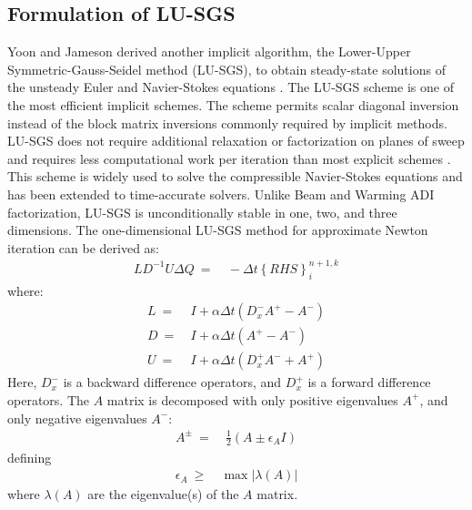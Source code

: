 \documentclass[conf]{new-aiaa}
\begin{document}
\subsection{Formulation of LU-SGS}
Yoon and Jameson derived another implicit algorithm, the Lower-Upper Symmetric-Gauss-Seidel method (LU-SGS), to obtain steady-state solutions of the unsteady Euler and Navier-Stokes equations \cite{LUSGS}.
The LU-SGS scheme is one of the most efficient implicit schemes. 
The scheme permits scalar diagonal inversion instead of the block matrix inversions commonly required by implicit methods.  
LU-SGS does not require additional relaxation or factorization on planes of sweep and requires less computational work per iteration than most explicit schemes \cite{YoonLUSGS}.
This scheme is widely used to solve the compressible Navier-Stokes equations and has been extended to time-accurate solvers. 
Unlike Beam and Warming \cite{Beam} ADI factorization, LU-SGS is unconditionally stable in one, two, and three dimensions. The one-dimensional LU-SGS method for approximate Newton iteration can be derived as:
\begin{equation}
	\begin{split}
	\label{eq:LSGSUFinal}
		LD^{-1}U\Delta{Q}~=&~-\Delta{t}\left\{RHS\right\}^{n+1, k}_i
	\end{split}
\end{equation}
where:
\begin{equation}
	\begin{split}
            L~=&~I + \alpha\Delta{t}\left(D_x^-A^+-A^-\right)\\
		D~=&~I + \alpha\Delta{t}\left(A^+-A^-\right) \\
		U~=&~I + \alpha\Delta{t}\left(D_x^+A^-+A^+\right)
	\end{split}
\end{equation}
Here, $D_x^-$ is a backward difference operators, and $D_x^+$ is a forward difference operators. The $A$ matrix is decomposed with only positive eigenvalues $A^+$, and only negative eigenvalues $A^-$:
\begin{equation}
	\begin{split}
		\label{eq:A_B}
  			A^{\pm}~=&~\frac{1}{2}\left(A\pm\epsilon_{A}{I}\right)
	\end{split}
\end{equation}
defining
\begin{equation}
	\begin{split}
		\label{eq:epsi_A_B}
  			\epsilon_A~\geq&~\max\left|\lambda(A)\right|
	\end{split}
\end{equation}
where $\lambda(A)$ are the eigenvalue(s) of the $A$ matrix.
\end{document}

